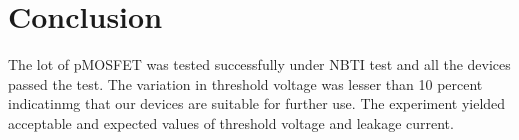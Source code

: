 \chapter{Conclusion}

The lot of pMOSFET was tested successfully under NBTI test and all the devices passed the test. The variation in threshold voltage was lesser than 10 percent indicatinmg that our devices are suitable for further use. The experiment yielded acceptable and expected values of threshold voltage and leakage current.



